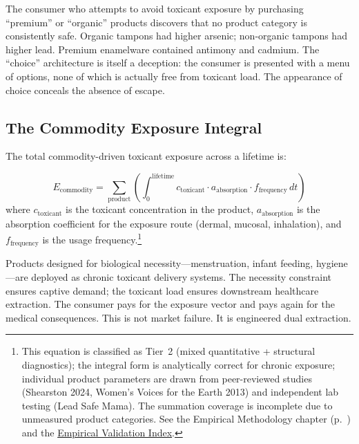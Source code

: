 The consumer who attempts to avoid toxicant exposure by purchasing ``premium'' or ``organic'' products discovers that no product category is consistently safe. Organic tampons had higher arsenic; non-organic tampons had higher lead. Premium enamelware contained antimony and cadmium. The ``choice'' architecture is itself a deception: the consumer is presented with a menu of options, none of which is actually free from toxicant load. The appearance of choice conceals the absence of escape.

\subsection{The Commodity Exposure Integral}

The total commodity-driven toxicant exposure across a lifetime is:

\begin{equation}\label{eq:commodity-exposure}
E_{\text{commodity}} = \sum_{\text{product}} \left( \int_{0}^{\text{lifetime}} c_{\text{toxicant}} \cdot a_{\text{absorption}} \cdot f_{\text{frequency}} \, dt \right)
\end{equation}
where $c_{\text{toxicant}}$ is the toxicant concentration in the product, $a_{\text{absorption}}$ is the absorption coefficient for the exposure route (dermal, mucosal, inhalation), and $f_{\text{frequency}}$ is the usage frequency.\footnote{This equation is classified as Tier~2 (mixed quantitative + structural diagnostics); the integral form is analytically correct for chronic exposure; individual product parameters are drawn from peer-reviewed studies (Shearston 2024, Women's Voices for the Earth 2013) and independent lab testing (Lead Safe Mama). The summation coverage is incomplete due to unmeasured product categories. See the Empirical Methodology chapter (p.~\pageref{ch:empirical_methodology}) and the \hyperref[app:empirical_index]{Empirical Validation Index}.}

\begin{keyinsight}
Products designed for biological necessity---menstruation, infant feeding, hygiene---are deployed as chronic toxicant delivery systems. The necessity constraint ensures captive demand; the toxicant load ensures downstream healthcare extraction. The consumer pays for the exposure vector and pays again for the medical consequences. This is not market failure. It is engineered dual extraction.
\end{keyinsight}

